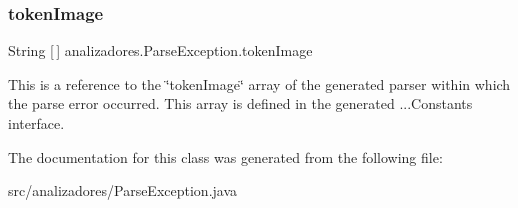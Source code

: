 \subsubsection{\texorpdfstring{token\+Image}{tokenImage}}
{\footnotesize\ttfamily String \mbox{[}$\,$\mbox{]} analizadores.\+Parse\+Exception.\+token\+Image}

This is a reference to the \char`\"{}token\+Image\char`\"{} array of the generated parser within which the parse error occurred. This array is defined in the generated ...Constants interface. 

The documentation for this class was generated from the following file\+:\begin{DoxyCompactItemize}
\item 
src/analizadores/Parse\+Exception.\+java\end{DoxyCompactItemize}
